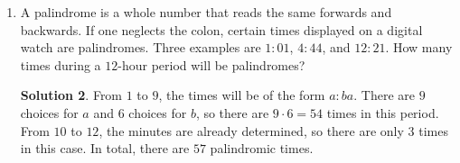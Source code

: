 \documentclass{article}
\theoremstyle{definition}
\newtheorem*{solution}{Solution}
\begin{document}
\begin{multicols*}{2}
\begin{enumerate}
\begin{center}
            \end{center}
            \begin{solution}
                The area of the shaded region is equal to the area of the quarter circle minus the area of the rectangle.
                The area of the rectangle is $4 \cdot 3 = 12$, so we just need the quarter circle.
                Applying the Pythagorean Theorem to $\triangle ADC$, we have $(AC)^2 = 4^2 + 3^2 \rightarrow AC = 5$.
                Since $ABCD$ is a rectangle, $BD = AC = 5$.
                Clearly $BD$ is a radius of the circle, so the area of the whole circle is $\pi 5^2 = 25\pi$ and the area of the quarter circle is $\frac{25\pi}{4}$.
				Subtracting the area of the rectangle gives $\frac{25\pi}{4} - 12$, which is between $7$ and $8$.
            \end{solution}
        \item A palindrome is a whole number that reads the same forwards and backwards.
            If one neglects the colon, certain times displayed on a digital watch are palindromes.
            Three examples are $1 : 01$, $4 : 44$, and $12 : 21$.
            How many times during a $12$-hour period will be palindromes?
            \begin{solution}
                From $1$ to $9$, the times will be of the form $a : ba$.
                There are $9$ choices for $a$ and $6$ choices for $b$, so there are $9 \cdot 6 = 54$ times in this period.
                From $10$ to $12$, the minutes are already determined, so there are only $3$ times in this case.
                In total, there are $57$ palindromic times.
            \end{solution}
    \end{enumerate}
\end{multicols*}
\end{document}
